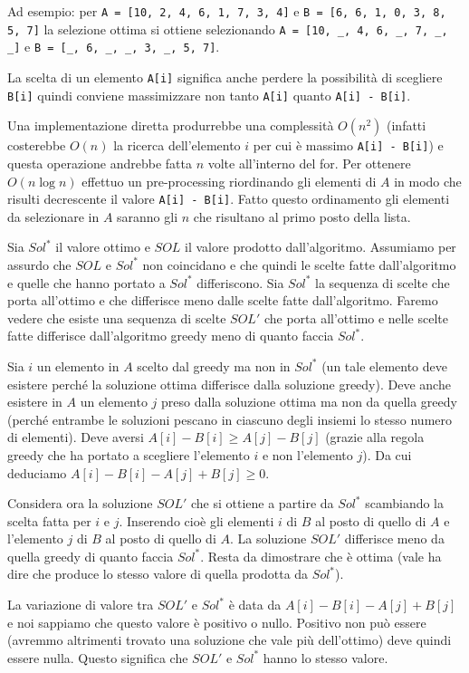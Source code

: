     Ad esempio: per \texttt{A = [10, 2, 4, 6, 1, 7, 3, 4]} e \texttt{B = [6, 6, 1, 0, 3, 8, 5, 7]} la selezione ottima si ottiene selezionando \texttt{A = [10, \_, 4, 6, \_, 7, \_, \_]} e \texttt{B = [\_, 6, \_, \_, 3, \_, 5, 7]}.

    La scelta di un elemento \verb|A[i]| significa anche perdere la possibilità di scegliere \verb|B[i]| quindi conviene massimizzare non tanto \verb|A[i]| quanto \verb|A[i] - B[i]|.

    Una implementazione diretta produrrebbe una complessità $O(n^{2})$ (infatti costerebbe $O(n)$ la ricerca dell'elemento $i$ per cui è massimo \verb|A[i] - B[i]|) e questa operazione andrebbe fatta $n$ volte all'interno del for. Per ottenere $O(n\log n)$ effettuo un pre-processing riordinando gli elementi di $A$ in modo che risulti decrescente il valore \verb|A[i] - B[i]|. Fatto questo ordinamento gli elementi da selezionare in $A$ saranno gli $n$ che risultano al primo posto della lista.

    \begin{demonstration}
        Sia $Sol^*$ il valore ottimo e $SOL$ il valore prodotto dall'algoritmo. Assumiamo per assurdo che $SOL$ e $Sol^*$ non coincidano e che quindi le scelte fatte dall'algoritmo e quelle che hanno portato a $Sol^*$ differiscono. Sia $Sol^*$ la sequenza di scelte che porta all'ottimo e che differisce meno dalle scelte fatte dall'algoritmo. Faremo vedere che esiste una sequenza di scelte $SOL'$ che porta all'ottimo e nelle scelte fatte differisce dall'algoritmo greedy meno di quanto faccia $Sol^*$.

        Sia $i$ un elemento in $A$ scelto dal greedy ma non in $Sol^*$ (un tale elemento deve esistere perché la soluzione ottima differisce dalla soluzione greedy). Deve anche esistere in $A$ un elemento $j$ preso dalla soluzione ottima ma non da quella greedy (perché entrambe le soluzioni pescano in ciascuno degli insiemi lo stesso numero di elementi). Deve aversi $A[i]-B[i] \geq A[j]-B[j]$ (grazie alla regola greedy che ha portato a scegliere l'elemento $i$ e non l'elemento $j$). Da cui deduciamo $A[i]-B[i]-A[j]+B[j]\geq 0$.

        Considera ora la soluzione $SOL'$ che si ottiene a partire da $Sol^*$ scambiando la scelta fatta per $i$ e $j$. Inserendo cioè gli elementi $i$ di $B$ al posto di quello di $A$ e l'elemento $j$ di $B$ al posto di quello di $A$. La soluzione $SOL'$ differisce meno da quella greedy di quanto faccia $Sol^*$. Resta da dimostrare che è ottima (vale ha dire che produce lo stesso valore di quella prodotta da $Sol^*$).

        La variazione di valore tra $SOL'$ e $Sol^*$ è data da $A[i]-B[i]-A[j]+B[j]$ e noi sappiamo che questo valore è positivo o nullo. Positivo non può essere (avremmo altrimenti trovato una soluzione che vale più dell'ottimo) deve quindi essere nulla. Questo significa che $SOL'$ e $Sol^*$ hanno lo stesso valore.
    \end{demonstration}

